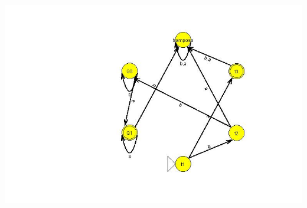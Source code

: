 \documentclass[a4paper,11pt]{article}
\begin{document}
\begin{center}
\includegraphics[width=\textwidth]{imagenSalida.jpg}
\end{center}
\end{document}
